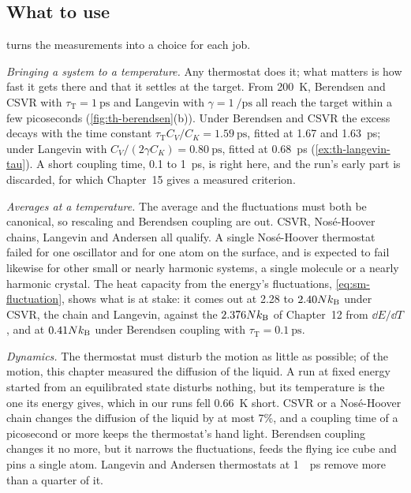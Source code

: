 \subsection*{What to use}

 turns the measurements into a choice for each job.

\emph{Bringing a system to a temperature.} Any thermostat does it; what
matters is how fast it gets there and that it settles at the target. From
\SI{200}{\kelvin}, Berendsen and CSVR with $\tau_{\mathrm T} =
\SI{1}{\pico\second}$ and Langevin with $\gamma = \SI{1}{\per\pico\second}$
all reach the target within a few picoseconds (\cref{fig:th-berendsen}(b)).
Under Berendsen and CSVR the excess decays with the time constant
$\tau_{\mathrm T}C_V/C_K = \SI{1.59}{\pico\second}$, fitted at 1.67 and
\SI{1.63}{\pico\second}; under Langevin with $C_V/(2\gamma C_K) =
\SI{0.80}{\pico\second}$, fitted at \SI{0.68}{\pico\second}
(\cref{ex:th-langevin-tau}). A short coupling time, 0.1 to
\SI{1}{\pico\second}, is right here, and the run's early part is
discarded, for which Chapter~15 gives a measured criterion.

\emph{Averages at a temperature.} The average and the fluctuations must
both be canonical, so rescaling and Berendsen coupling are out. CSVR,
Nosé-Hoover chains, Langevin and Andersen all qualify. A single
Nosé-Hoover thermostat failed for one oscillator and for one atom on the
surface, and is expected to fail likewise for other small or nearly
harmonic systems, a single molecule or a nearly harmonic
crystal\cite{Martyna1992}. The heat capacity from the energy's
fluctuations, \cref{eq:sm-fluctuation}, shows what is at stake: it comes
out at 2.28 to $2.40Nk_{\mathrm{B}}$ under CSVR, the chain and Langevin, against the
$2.376Nk_{\mathrm{B}}$ of Chapter~12 from $\dd E/\dd T$, and at $0.41Nk_{\mathrm{B}}$ under
Berendsen coupling with $\tau_{\mathrm T} = \SI{0.1}{\pico\second}$.

\emph{Dynamics.} The thermostat must disturb the motion as little as
possible; of the motion, this chapter measured the diffusion of the
liquid. A run at fixed energy started from an equilibrated state disturbs
nothing, but its temperature is the one its energy gives, which in our
runs fell \SI{0.66}{\kelvin} short. CSVR or a Nosé-Hoover chain changes
the diffusion of the liquid by at most 7\%, and a coupling time of a
picosecond or more keeps the thermostat's hand light. Berendsen coupling
changes it no more, but it narrows the fluctuations, feeds the flying ice
cube and pins a single atom. Langevin and Andersen thermostats at
\SI{1}{\per\pico\second} remove more than a quarter of it.


